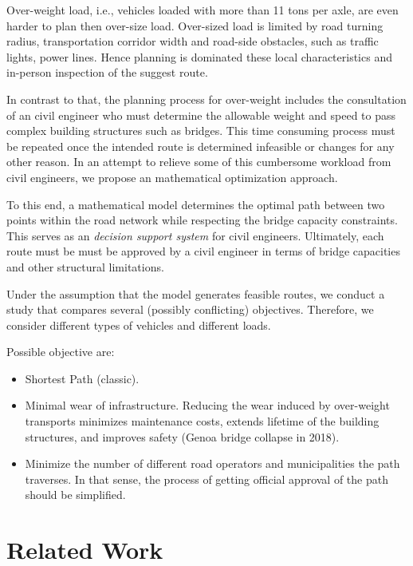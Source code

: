 

Over-weight load, i.e., vehicles loaded with more than 11 tons per axle,
are even harder to plan then over-size load. Over-sized load is limited
by road turning radius, transportation corridor width and road-side obstacles, such as traffic lights, power lines. Hence planning is dominated these local characteristics
and in-person inspection of the suggest route.

In contrast to that, the planning process for over-weight includes the consultation
of an civil engineer who must determine the allowable weight and speed to pass
complex building structures such as bridges.
This time consuming process must be repeated once the intended route is determined infeasible or changes for any other reason.
In an attempt to relieve some of this cumbersome workload from civil engineers,
we propose an mathematical optimization approach.

To this end, a mathematical model determines the optimal path between two
points within the road network while respecting the bridge capacity constraints.
This serves as an \textit{decision support system} for civil engineers.
Ultimately,  each route must be must be approved by a civil engineer  in terms of
bridge capacities and other structural limitations.

Under the assumption that the model generates feasible routes,
we conduct a study that compares several (possibly conflicting) objectives.
Therefore, we consider different types of vehicles and different loads.

Possible objective are:
\begin{itemize}
  \item Shortest Path (classic).

  \item Minimal wear of infrastructure. Reducing the wear induced by over-weight transports
  minimizes maintenance costs, extends lifetime of the building structures, and
  improves safety (Genoa bridge collapse in 2018).

  \item Minimize the number of different road operators and municipalities the path
  traverses. In that sense, the process of getting official approval of the
  path should be simplified.
\end{itemize}

\section{Related Work}




